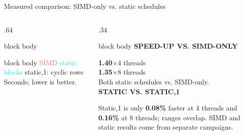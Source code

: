 \documentclass[aspectratio=169,10pt]{beamer}
\newcommand{\smallmuted}[1]{{\color{muted}\small #1}}
\newcommand{\metric}[2]{%
  {\color{#1}\Large\bfseries #2}}
\newcommand{\cardtitle}[2]{%
  {\color{#1}\bfseries\small #2}\par\vspace{.08cm}}
\begin{document}
\begin{frame}{Measured comparison: SIMD-only vs. static schedules}
\begin{columns}[T,onlytextwidth]
\begin{column}{.64\textwidth}
\begin{beamercolorbox}[rounded=true,sep=.18cm,wd=\textwidth]{block body}
      \end{beamercolorbox}
      \vspace{.12cm}
      \begin{beamercolorbox}[rounded=true,sep=.14cm,wd=\textwidth]{block body}
        \scriptsize
        \textcolor{coral}{SIMD} \quad
        \textcolor{cyan}{static: blocks} \quad
        \textcolor{mint}{static,1: cyclic rows}
        \hfill Seconds; lower is better.
      \end{beamercolorbox}
    \end{column}
    \begin{column}{.34\textwidth}
      \begin{beamercolorbox}[rounded=true,sep=.2cm,wd=\textwidth]{block body}
        \cardtitle{mint}{SPEED-UP VS. SIMD-ONLY}
        \metric{mint}{1.40$\times$}\quad\small 4 threads\\[.04cm]
        \metric{mint}{1.35$\times$}\quad\small 8 threads\\[.08cm]
        \footnotesize Both static schedules vs. SIMD-only.\\[.1cm]
        \cardtitle{coral}{STATIC VS. STATIC,1}
        \footnotesize Static,1 is only \textbf{0.08\%} faster at 4 threads and
        \textbf{0.16\%} at 8 threads; ranges overlap.
        \smallmuted{SIMD and static results come from separate campaigns.}
      \end{beamercolorbox}
    \end{column}
  \end{columns}
\end{frame}
\end{document}

